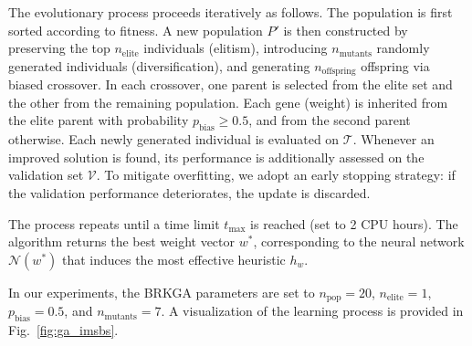 \documentclass[runningheads]{llncs}
\begin{document}
 The evolutionary process proceeds iteratively as follows. The population is first sorted according to fitness. A new population $P'$ is then constructed by preserving the top $n_{\text{elite}}$ individuals (elitism), introducing $n_{\text{mutants}}$ randomly generated individuals (diversification), and generating $n_{\text{offspring}}$ offspring via biased crossover. In each crossover, one parent is selected from the elite set and the other from the remaining population. Each gene (weight) is inherited from the elite parent with probability $p_{\text{bias}} \geq 0.5$, and from the second parent otherwise. Each newly generated individual is evaluated on $\mathcal{T}$. Whenever an improved solution is found, its performance is additionally assessed on the validation set $\mathcal{V}$. To mitigate overfitting, we adopt an early stopping strategy: if the validation performance deteriorates, the update is discarded.
 
 The process repeats until a time limit $t_{\max}$ is reached (set to 2 CPU hours). The algorithm returns the best weight vector $w^\ast$, corresponding to the neural network $\mathcal{N}(w^\ast)$ that induces the most effective heuristic $h_w$.
 
 In our experiments, the BRKGA parameters are set to $n_{\text{pop}}=20$, $n_{\text{elite}}=1$, $p_{\text{bias}}=0.5$, and $n_{\text{mutants}}=7$. A visualization of the learning process is provided in Fig.~\ref{fig:ga_imsbs}.
\end{document}
